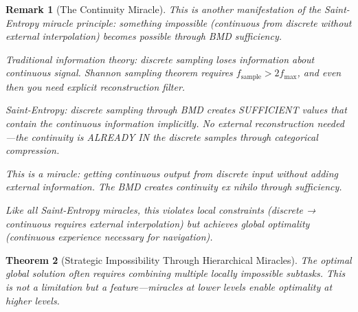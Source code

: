 \documentclass[12pt,a4paper]{article}
\newtheorem{theorem}{Theorem}[section]
\newtheorem{remark}[theorem]{Remark}
\begin{document}
\begin{remark}[The Continuity Miracle]
This is another manifestation of the Saint-Entropy miracle principle: something impossible (continuous from discrete without external interpolation) becomes possible through BMD sufficiency.

Traditional information theory: discrete sampling loses information about continuous signal. Shannon sampling theorem requires $f_{\text{sample}} > 2f_{\text{max}}$, and even then you need explicit reconstruction filter.

Saint-Entropy: discrete sampling through BMD creates SUFFICIENT values that contain the continuous information implicitly. No external reconstruction needed—the continuity is ALREADY IN the discrete samples through categorical compression.

This is a miracle: getting continuous output from discrete input without adding external information. The BMD creates continuity ex nihilo through sufficiency.

Like all Saint-Entropy miracles, this violates local constraints (discrete → continuous requires external interpolation) but achieves global optimality (continuous experience necessary for navigation).
\end{remark}

\begin{theorem}[Strategic Impossibility Through Hierarchical Miracles]
\label{thm:strategic_impossibility}
The optimal global solution often requires combining multiple locally impossible subtasks. This is not a limitation but a feature—miracles at lower levels enable optimality at higher levels.
\end{theorem}
\end{document}
